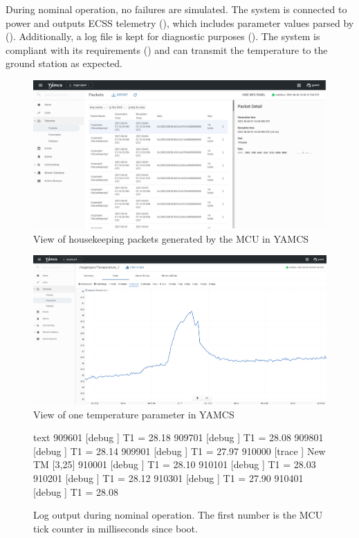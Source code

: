 \documentclass[a4paper,nobib]{tufte-book}
\begin{document}
During nominal operation, no failures are simulated. The system is connected to power and outputs \ac{ECSS} telemetry (), which includes parameter values parsed by (). Additionally, a log file is kept for diagnostic purposes (). The system is compliant with its requirements () and can transmit the temperature to the ground station as expected.

\begin{figure}
	\centering
	\includegraphics{media/screenshots/yamcs_housekeeping}
	\caption{View of housekeeping packets generated by the \acs{MCU} in \acs{YAMCS}}
	\label{fig:yamcshousekeeping}
\end{figure}

\begin{figure}[h]
	\centering
	\includegraphics{media/screenshots/yamcs_parameter}
	\caption{View of one temperature parameter in \acs{YAMCS}}
	\label{fig:yamcsparameter}
\end{figure}

\begin{figure}
\begin{cminted}{text}
909601  [debug  ] T1 = 28.18
909701  [debug  ] T1 = 28.08
909801  [debug  ] T1 = 28.14
909901  [debug  ] T1 = 27.97
910000  [trace  ] New TM [3,25]
910001  [debug  ] T1 = 28.10
910101  [debug  ] T1 = 28.03
910201  [debug  ] T1 = 28.12
910301  [debug  ] T1 = 27.90
910401  [debug  ] T1 = 28.08
\end{cminted}
\caption[Log output during nominal operation]{Log output during nominal operation. The first number is the \ac{MCU} tick counter in milliseconds since boot.}
\label{fig:lognominal}
\end{figure}
\end{document}
